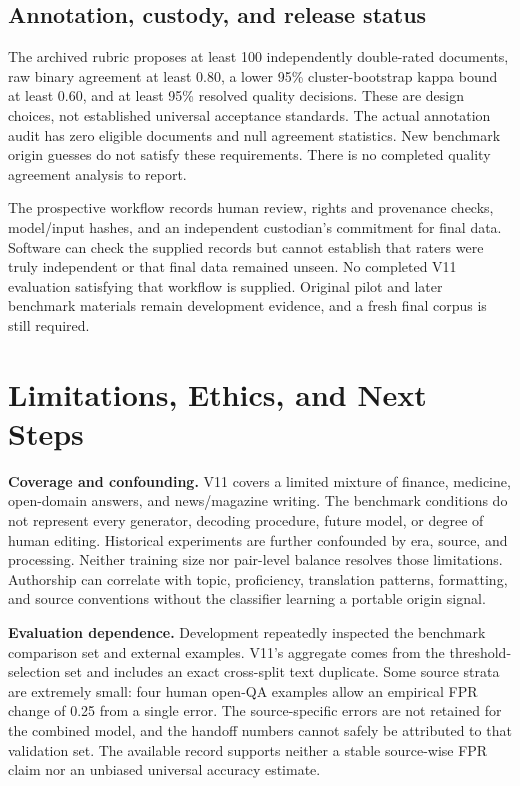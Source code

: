 \documentclass[11pt]{article}
\begin{document}
\subsection{Annotation, custody, and release status}
The archived rubric proposes at least 100 independently double-rated
documents, raw binary agreement at least 0.80, a lower 95\% cluster-bootstrap
kappa bound at least 0.60, and at least 95\% resolved quality decisions.
These are design choices, not established universal acceptance standards.
The actual annotation audit has zero eligible documents and null agreement
statistics. New benchmark origin guesses do not satisfy these requirements.
There is no completed quality agreement analysis to report.

The prospective workflow records human review, rights and provenance checks,
model/input hashes, and an independent custodian's commitment for final
data. Software can check the supplied records but cannot establish that
raters were truly independent or that final data remained unseen. No
completed V11 evaluation satisfying that workflow is supplied. Original
pilot and later benchmark materials remain development evidence, and a
fresh final corpus is still required.

\section{Limitations, Ethics, and Next Steps}
\textbf{Coverage and confounding.} V11 covers a limited mixture of finance,
medicine, open-domain answers, and news/magazine writing. The benchmark
conditions do not represent every generator, decoding procedure, future
model, or degree of human editing. Historical experiments are further
confounded by era, source, and processing. Neither training size nor
pair-level balance resolves those limitations. Authorship can correlate
with topic, proficiency, translation patterns, formatting, and source
conventions without the classifier learning a portable origin signal.

\textbf{Evaluation dependence.} Development repeatedly inspected the
benchmark comparison set and external examples. V11's aggregate comes
from the threshold-selection set and includes an exact cross-split text
duplicate. Some source strata are extremely small: four human open-QA
examples allow an empirical FPR change of 0.25 from a single error. The
source-specific errors are not retained for the combined model, and the
handoff numbers cannot safely be attributed to that validation set. The
available record supports neither a stable source-wise FPR claim nor an
unbiased universal accuracy estimate.
\end{document}
